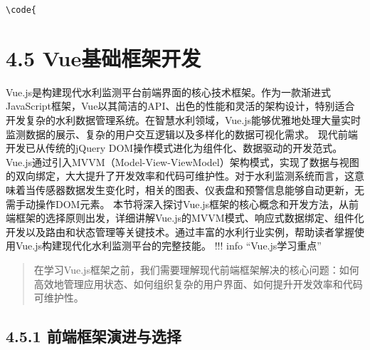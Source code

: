 \texttt{\textbackslash{}code\{\ } \section{4.5 Vue基础框架开发}\label{vueux57faux7840ux6846ux67b6ux5f00ux53d1}
Vue.js是构建现代水利监测平台前端界面的核心技术框架。作为一款渐进式JavaScript框架，Vue以其简洁的API、出色的性能和灵活的架构设计，特别适合开发复杂的水利数据管理系统。在智慧水利领域，Vue.js能够优雅地处理大量实时监测数据的展示、复杂的用户交互逻辑以及多样化的数据可视化需求。
现代前端开发已从传统的jQuery
DOM操作模式进化为组件化、数据驱动的开发范式。Vue.js通过引入MVVM（Model-View-ViewModel）架构模式，实现了数据与视图的双向绑定，大大提升了开发效率和代码可维护性。对于水利监测系统而言，这意味着当传感器数据发生变化时，相关的图表、仪表盘和预警信息能够自动更新，无需手动操作DOM元素。
本节将深入探讨Vue.js框架的核心概念和开发方法，从前端框架的选择原则出发，详细讲解Vue.js的MVVM模式、响应式数据绑定、组件化开发以及路由和状态管理等关键技术。通过丰富的水利行业实例，帮助读者掌握使用Vue.js构建现代化水利监测平台的完整技能。
!!! info ``Vue.js学习重点'' \begin{quote}
 在学习Vue.js框架之前，我们需要理解现代前端框架解决的核心问题：如何高效地管理应用状态、如何组织复杂的用户界面、如何提升开发效率和代码可维护性。

\end{quote} \subsection{4.5.1 前端框架演进与选择}\label{ux524dux7aefux6846ux67b6ux6f14ux8fdbux4e0eux9009ux62e9}

